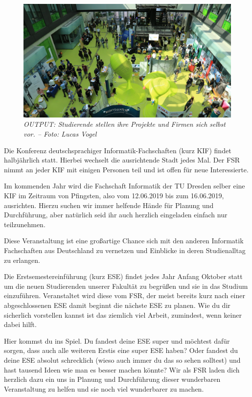 \begin{figure}[b!]
	\centering
  \includegraphics[width=\linewidth]{img/output}
  \caption*{\small \centering \textit{OUTPUT: Studierende stellen ihre Projekte und Firmen sich selbst vor. -- Foto: Lucas Vogel}}
\end{figure}%


Die Konferenz deutschsprachiger Informatik-Fachschaften (kurz KIF) findet halbjährlich statt. Hierbei wechselt die ausrichtende Stadt jedes Mal. Der FSR nimmt an jeder KIF mit einigen Personen teil und ist offen für neue Interessierte.

Im kommenden Jahr wird die Fachschaft Informatik der TU Dresden selber eine KIF im Zeitraum von Pfingsten, also vom 12.06.2019 bis zum 16.06.2019, ausrichten. Hierzu suchen wir immer helfende Hände für Planung und Durchführung, aber natürlich seid ihr auch herzlich eingeladen einfach nur teilzunehmen.

\pagebreak

Diese Veranstaltung ist eine großartige Chance sich mit den anderen Informatik Fachschaften aus Deutschland zu vernetzen und Einblicke in deren Studienalltag zu erlangen.


Die Erstsemestereinführung (kurz ESE) findet jedes Jahr Anfang Oktober statt um die neuen Studierenden unserer Fakultät zu begrüßen und sie in das Studium einzuführen. Veranstaltet wird diese vom FSR, der meist bereits kurz nach einer abgeschlossenen ESE damit beginnt die nächste ESE zu planen. Wie du dir sicherlich vorstellen kannst ist das ziemlich viel Arbeit, zumindest, wenn keiner dabei hilft.

Hier kommst du ins Spiel. Du fandest deine ESE super und möchtest dafür sorgen, dass auch alle weiteren Erstis eine super ESE haben? Oder fandest du deine ESE absolut schrecklich (wieso auch immer du das so sehen solltest) und hast tausend Ideen wie man es besser machen könnte? Wir als FSR laden dich herzlich dazu ein uns in Planung und Durchführung dieser wunderbaren Veranstaltung zu helfen und sie noch viel wunderbarer zu machen.

